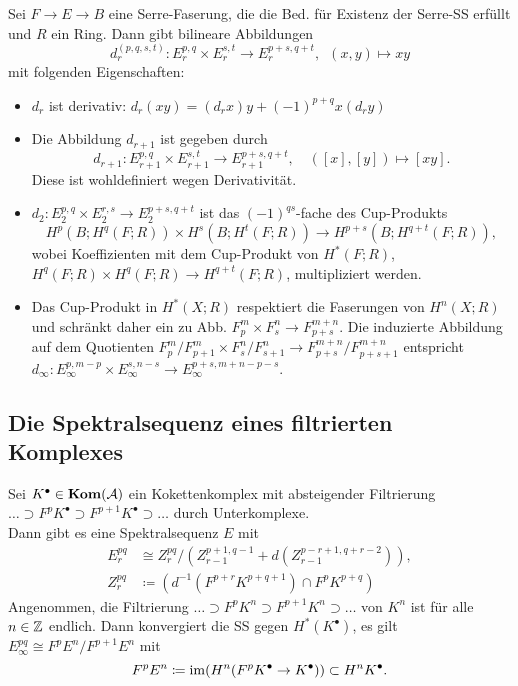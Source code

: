 \documentclass{cheat-sheet}
\newcommand{\CCC}[1]{{#1}^{\bullet}} %
\begin{document}
\begin{lem}
  Sei $F \!\to\! E \!\to\! B$ eine Serre-Faserung, die die Bed. für Existenz der Serre-SS erfüllt und  $R$ ein Ring.
  Dann gibt bilineare Abbildungen
  \[ d^{(p,q,s,t)}_r : E^{p,q}_r \times E^{s,t}_r \to E^{p+s,q+t}_r, \enspace (x, y) \mapsto xy \]
  mit folgenden Eigenschaften:
  \begin{itemize}
    \item $d_r$ ist derivativ: $d_r(xy) = (d_r x) y + (-1)^{p+q} x (d_r y)$
    \item Die Abbildung $d_{r+1}$ ist gegeben durch
    \[
      d_{r+1} : E^{p,q}_{r+1} \times E^{s,t}_{r+1} \to E^{p+s,q+t}_{r+1}, \quad
      ([x], [y]) \mapsto [xy].
    \]
    Diese ist wohldefiniert wegen Derivativität.
    \item $d_2 : E_2^{p,q} \!\times\! E_2^{r,s} \!\to\! E_2^{p+s,q+t}$ ist das $(-1)^{qs}$-fache des Cup-Produkts
    \[ H^p(B; H^q(F; R)) \times H^s(B; H^t(F; R)) \to H^{p+s}(B; H^{q+t}(F; R)), \]
    wobei Koeffizienten mit dem Cup-Produkt von $H^*(F; R)$, $H^q(F; R) \times H^q(F; R) \to H^{q+t}(F; R)$, multipliziert werden.
    \item Das Cup-Produkt in $H^*(X; R)$ respektiert die Faserungen von $H^n(X; R)$ und schränkt daher ein zu Abb. $F_p^m \times F_s^n \to F_{p+s}^{m+n}$.
    Die induzierte Abbildung auf dem Quotienten $F^m_p/F^m_{p+1} \times F^n_s/F^n_{s+1} \to F^{m+n}_{p+s} / F^{m+n}_{p+s+1}$ entspricht $d_\infty : E_\infty^{p,m-p} \times E_\infty^{s,n-s} \to E_\infty^{p+s,m+n-p-s}$.
  \end{itemize}
\end{lem}

\subsection{Die Spektralsequenz eines filtrierten Komplexes}

\begin{defn}
  Sei $\CCC{K} \in \Kom(\Aat)$ ein Kokettenkomplex mit absteigender Filtrierung $\ldots \supset F^p \CCC{K} \supset F^{p+1} \CCC{K} \supset \ldots$ durch Unterkomplexe. \\
  Dann gibt es eine Spektralsequenz $E$ mit
  \begin{align*}
    E^{pq}_r & \cong Z^{pq}_r / (Z^{p+1,q-1}_{r-1} + d(Z^{p-r+1,q+r-2}_{r-1})), \\
    Z^{pq}_r & \coloneqq (d^{-1}(F^{p+r} K^{p+q+1}) \cap F^p K^{p+q})
  \end{align*}
  Angenommen, die Filtrierung $\ldots \supset F^p K^n \supset F^{p+1} K^n \supset \ldots$ von $K^n$ ist für alle $n \in \mathbb{Z}$ endlich.
  Dann konvergiert die SS gegen $H^*(\CCC{K})$, \dh{} es gilt $E^{pq}_\infty \cong F^p E^n / F^{p+1} E^n$ mit
  \[ F^p E^n \coloneqq \im(H^n(F^p \CCC{K} \to \CCC{K})) \subset H^n\CCC{K}. \]
\end{defn}
\end{document}
